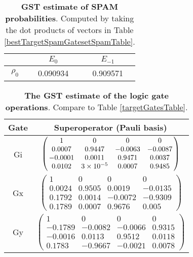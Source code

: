 {\begin{table}[h]
\begin{center}
\begin{tabular}[l]{|c|c|c|}
\hline
 & $E_{0}$ & $E_{-1}$ \\ \hline
$\rho_{0}$ & 0.090934 & 0.909571 \\ \hline
\end{tabular}

\caption{\textbf{GST estimate of SPAM probabilities}.  Computed by taking the dot products of vectors in Table \ref{bestTargetSpamGatesetSpamTable}.\label{bestTargetSpamGatesetSpamParametersTable}}
\end{center}
\end{table}

\begin{table}[h]
\begin{center}
\begin{tabular}[l]{|c|c|}
\hline
Gate & Superoperator (Pauli basis) \\ \hline
Gi & $ \left(\!\!\begin{array}{cccc}
1 & 0 & 0 & 0 \\ 
0.0007 & 0.9447 & -0.0063 & -0.0087 \\ 
-0.0001 & 0.0011 & 0.9471 & 0.0037 \\ 
0.0102 & 3\times 10^{-5} & 0.0007 & 0.9485
 \end{array}\!\!\right) $
 \\ \hline
Gx & $ \left(\!\!\begin{array}{cccc}
1 & 0 & 0 & 0 \\ 
0.0024 & 0.9505 & 0.0019 & -0.0135 \\ 
0.1792 & 0.0014 & -0.0072 & -0.9309 \\ 
0.1789 & 0.0007 & 0.9676 & 0.005
 \end{array}\!\!\right) $
 \\ \hline
Gy & $ \left(\!\!\begin{array}{cccc}
1 & 0 & 0 & 0 \\ 
-0.1789 & -0.0082 & -0.0066 & 0.9315 \\ 
-0.0016 & 0.0113 & 0.9512 & 0.0118 \\ 
0.1783 & -0.9667 & -0.0021 & 0.0078
 \end{array}\!\!\right) $
 \\ \hline
\end{tabular}

\caption{\textbf{The GST estimate of the logic gate operations}.  Compare to Table \ref{targetGatesTable}.\label{bestTargetSpamGatesetGatesTable}}
\end{center}
\end{table}

}
